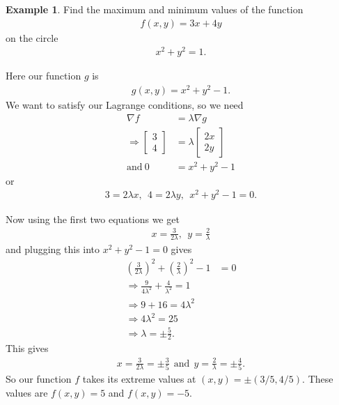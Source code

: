 \documentclass[12pt, letter]{article}
\theoremstyle{plain}
\numberwithin{theorem}{section}
\theoremstyle{definition}
\newtheorem{example}[theorem]{Example}
\begin{document}
\begin{example}
Find the maximum and minimum values of the function
\begin{align*}
f(x,y) = 3x+4y
\end{align*}
on the circle
\begin{align*}
x^2+y^2=1.
\end{align*}

\bigskip

Here our function $g$ is
\begin{align*}
g(x,y) = x^2+y^2 - 1.
\end{align*}
We want to satisfy our Lagrange conditions, so we need
\begin{align*}
\nabla f &= \lambda \nabla g \\ 
\Rightarrow \begin{bmatrix} 3 \\ 4 \end{bmatrix} &= \lambda \begin{bmatrix} 2x \\ 2y \end{bmatrix}\\
\text{and} \ 0&= x^2+y^2 - 1
\end{align*}
or
\begin{align*}
3=2\lambda x, \ \ 4=2\lambda y, \ \ x^2+y^2 - 1=0.
\end{align*}
\end{example}
Now using the first two equations we get
\begin{align*}
x=\frac{3}{2\lambda}, \ \ y=\frac{2}{\lambda}
\end{align*}
and plugging this into $x^2+y^2 - 1=0$ gives
\begin{align*}
\left(\frac{3}{2\lambda}\right)^2+\left(\frac{2}{\lambda}\right)^2-1&=0\\
\Rightarrow \frac{9}{4\lambda^2}+\frac{4}{\lambda^2} = 1\\
\Rightarrow 9+16=4\lambda^2\\
\Rightarrow 4\lambda^2=25\\
\Rightarrow \lambda = \pm \frac{5}{2}.
\end{align*}
This gives
\begin{align*}
x=\frac{3}{2\lambda} = \pm \frac{3}{5} \ \ \text{and} \ \ y=\frac{2}{\lambda} = \pm \frac{4}{5}.
\end{align*}
So our function $f$ takes its extreme values at $(x,y) = \pm(3/5,4/5)$. These values are $f(x,y) =5$ and $f(x,y) = -5$.

\newpage
\end{document}
